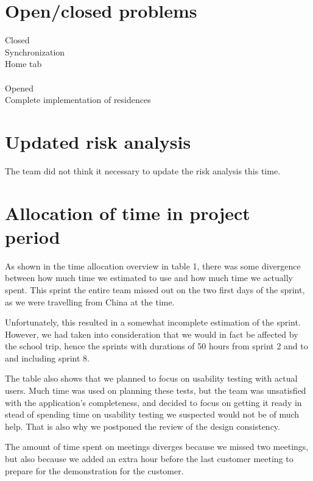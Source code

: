 \documentclass[12pt]{article}
\begin{document}
\section{Open/closed problems}
Closed \\
Synchronization\\
Home tab\\\\
Opened \\
Complete implementation of residences

\section{Updated risk analysis}
The team did not think it necessary to update the risk analysis this time.


\section{Allocation of time in project period}
As shown in the time allocation overview in table 1, there was some divergence between how much time we estimated to use and how much time we actually spent. This sprint the entire team missed out on the two first days of the sprint, as we were travelling from China at the time. 

Unfortunately, this resulted in a somewhat incomplete estimation of the sprint. However, we had taken into consideration that we would in fact be affected by the school trip, hence the sprints with durations of 50 hours from sprint 2 and to and including sprint 8.

The table also shows that we planned to focus on usability testing with actual users. Much time was used on planning these tests, but the team was unsatisfied with the application's completeness, and decided to focus on getting it ready in stead of spending time on usability testing we suspected would not be of much help. That is also why we postponed the review of the design consistency.

The amount of time spent on meetings diverges because we missed two meetings, but also because we added an extra hour before the last customer meeting to prepare for the demonstration for the customer.
\end{document}
